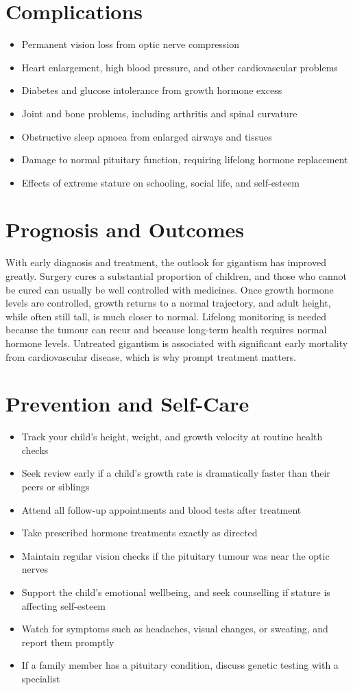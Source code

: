 \section*{Complications}
\begin{itemize}
    \item Permanent vision loss from optic nerve compression
    \item Heart enlargement, high blood pressure, and other cardiovascular problems
    \item Diabetes and glucose intolerance from growth hormone excess
    \item Joint and bone problems, including arthritis and spinal curvature
    \item Obstructive sleep apnoea from enlarged airways and tissues
    \item Damage to normal pituitary function, requiring lifelong hormone replacement
    \item Effects of extreme stature on schooling, social life, and self-esteem
\end{itemize}

\section*{Prognosis and Outcomes}
With early diagnosis and treatment, the outlook for gigantism has improved greatly. Surgery cures a substantial proportion of children, and those who cannot be cured can usually be well controlled with medicines. Once growth hormone levels are controlled, growth returns to a normal trajectory, and adult height, while often still tall, is much closer to normal. Lifelong monitoring is needed because the tumour can recur and because long-term health requires normal hormone levels. Untreated gigantism is associated with significant early mortality from cardiovascular disease, which is why prompt treatment matters.

\section*{Prevention and Self-Care}
\begin{itemize}
    \item Track your child's height, weight, and growth velocity at routine health checks
    \item Seek review early if a child's growth rate is dramatically faster than their peers or siblings
    \item Attend all follow-up appointments and blood tests after treatment
    \item Take prescribed hormone treatments exactly as directed
    \item Maintain regular vision checks if the pituitary tumour was near the optic nerves
    \item Support the child's emotional wellbeing, and seek counselling if stature is affecting self-esteem
    \item Watch for symptoms such as headaches, visual changes, or sweating, and report them promptly
    \item If a family member has a pituitary condition, discuss genetic testing with a specialist
\end{itemize}

